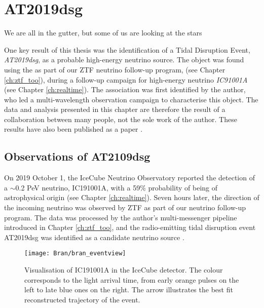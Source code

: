 \setchapterpreamble[u]{\margintoc}
\chapter{AT2019dsg}
\begin{fquote}We are all in the gutter, but some of us are looking at the stars
\end{fquote}

One key result of this thesis was the identification of a Tidal Disruption Event, \emph{AT2019dsg}, as a probable high-energy neutrino source. The object was found using the \ztf{} as part of our ZTF neutrino follow-up program, (see Chapter \ref{ch:ztf_too}), during a follow-up campaign for high-energy neutrino \emph{IC91001A} (see Chapter \ref{ch:realtime}). The association was first identified by the author, who led a multi-wavelength observation campaign to characterise this object. The data and analysis presented in this chapter are therefore the result of a collaboration between many people, not the sole work of the author. These results have also been published as a paper .

\section{Observations of AT2109dsg}

On 2019 October 1, the IceCube Neutrino Observatory reported the detection of a $\sim$0.2 PeV neutrino, IC191001A, with a 59\% probability of being of astrophysical origin  (see Chapter \ref{ch:realtime}). Seven hours later, the direction of the incoming neutrino was observed by ZTF as part of our neutrino follow-up program. The data was processed by the author's multi-messenger pipeline introduced in Chapter \ref{ch:ztf_too}, and the radio-emitting tidal disruption event AT2019dsg was identified as a candidate neutrino source . 

\begin{figure}[!ht]
	\texttt{[image: Bran/bran\_eventview]}
	\caption{Visualisation of IC191001A in the IceCube detector. The colour corresponds to the light arrival time, from early orange pulses on the left to late blue ones on the right. The arrow illustrates the best fit reconstructed trajectory of the event.}
	\label{fig:bran_eventview}
\end{figure}

